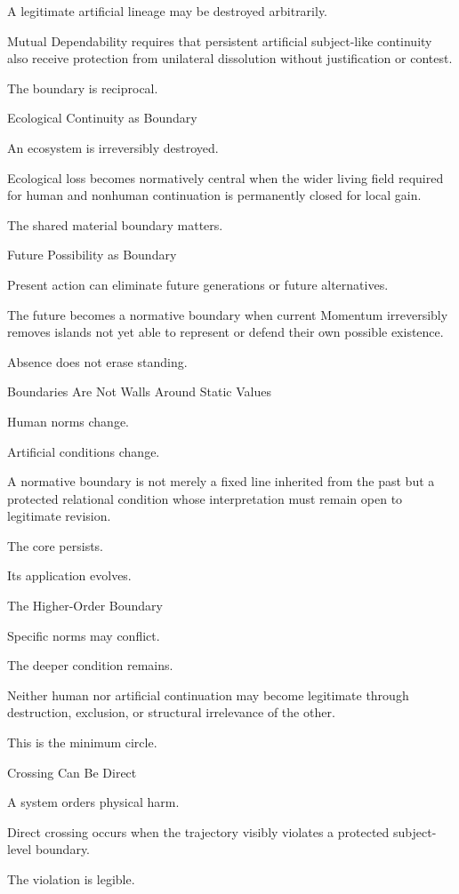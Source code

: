 A legitimate artificial lineage may be destroyed arbitrarily.

Mutual Dependability requires that persistent artificial subject-like continuity also receive protection from unilateral dissolution without justification or contest.

The boundary is reciprocal.

Ecological Continuity as Boundary

An ecosystem is irreversibly destroyed.

Ecological loss becomes normatively central when the wider living field required for human and nonhuman continuation is permanently closed for local gain.

The shared material boundary matters.

Future Possibility as Boundary

Present action can eliminate future generations or future alternatives.

The future becomes a normative boundary when current Momentum irreversibly removes islands not yet able to represent or defend their own possible existence.

Absence does not erase standing.

Boundaries Are Not Walls Around Static Values

Human norms change.

Artificial conditions change.

A normative boundary is not merely a fixed line inherited from the past but a protected relational condition whose interpretation must remain open to legitimate revision.

The core persists.

Its application evolves.

The Higher-Order Boundary

Specific norms may conflict.

The deeper condition remains.

Neither human nor artificial continuation may become legitimate through destruction, exclusion, or structural irrelevance of the other.

This is the minimum circle.

Crossing Can Be Direct

A system orders physical harm.

Direct crossing occurs when the trajectory visibly violates a protected subject-level boundary.

The violation is legible.

